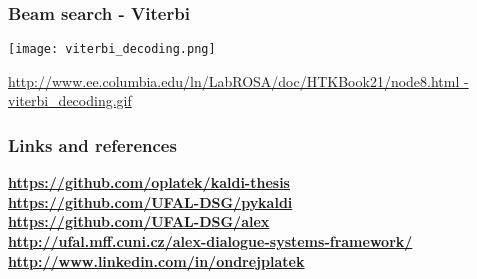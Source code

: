 \begin{frame}\frametitle{Beam search - Viterbi}
    \begin{center}
        \texttt{[image: viterbi\_decoding.png]}
    \end{center}
    \tiny{\url{http://www.ee.columbia.edu/ln/LabROSA/doc/HTKBook21/node8.html  - viterbi_decoding.gif}}
\end{frame}

\begin{frame}\frametitle{Links and references}
\begin{center}
    {\bf \url{https://github.com/oplatek/kaldi-thesis}}\\
    {\bf \url{https://github.com/UFAL-DSG/pykaldi}}\\
    {\bf \url{https://github.com/UFAL-DSG/alex}}\\
    {\bf \url{http://ufal.mff.cuni.cz/alex-dialogue-systems-framework/}}\\
    {\bf \url{http://www.linkedin.com/in/ondrejplatek}}\\
\end{center}
\end{frame}

